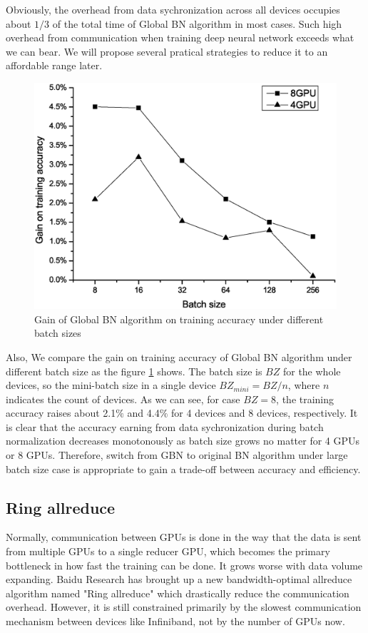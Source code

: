 Obviously, the overhead from data sychronization across all devices occupies about $1/3$ of the total time of Global BN algorithm in most cases. Such high overhead from communication when training deep neural network exceeds what we can bear. We will propose several pratical strategies to reduce it to an affordable range later.

\begin{figure}[!hbp]
    \centering
    \includegraphics[width=0.8\linewidth]{figure/accVsBz.eps}
    \caption{Gain of Global BN algorithm on training accuracy under different batch sizes}
    \label{fig:accVsBz}
    \end{figure}

Also, We compare the gain on training accuracy of Global BN algorithm under different batch size as the figure \ref{fig:accVsBz} shows. The batch size is $BZ$ for the whole devices, so the mini-batch size in a single device $BZ_{mini}=BZ/n$, where $n$ indicates the count of devices. 
As we can see, for case $BZ=8$, the training accuracy raises about 2.1$\%$ and 4.4$\%$ for 4 devices and 8 devices, respectively. It is clear that the accuracy earning from data sychronization during batch normalization decreases monotonously as batch size grows no matter for 4 GPUs or 8 GPUs. Therefore, switch from GBN to original BN algorithm under 
large batch size case is appropriate to gain a trade-off between accuracy and efficiency.


\subsection{Ring allreduce}

Normally, communication between GPUs is done in the way that the data is sent from multiple GPUs to a single reducer GPU, which becomes the primary bottleneck in how fast the training can be done. It grows worse with data volume expanding. Baidu Research has brought up a new bandwidth-optimal allreduce algorithm named "Ring allreduce"\cite{} which drastically reduce the communication overhead. However, it is still constrained primarily by the slowest communication mechanism between devices like Infiniband, not by the number of GPUs now.

